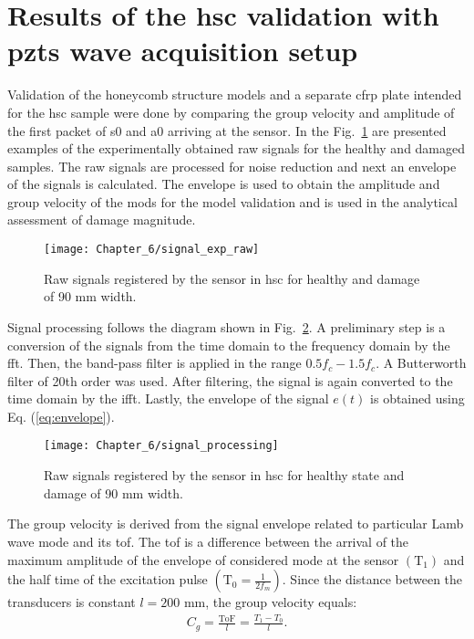 \section{Results of the \acs{hsc} validation with \acsp{pzt} wave acquisition setup}
\label{sec:resuls_pzt}
Validation of the honeycomb structure models and a separate \ac{cfrp} plate intended for the \ac{hsc} sample were done by comparing the group velocity and amplitude of the first packet of \ac{s0} and \ac{a0} arriving at the sensor.
In the Fig.~\ref{fig:signal_exp_raw} are presented examples of the experimentally obtained raw signals for the healthy and damaged samples.
The raw signals are processed for noise reduction and next an envelope of the signals is calculated.
The envelope is used to obtain the amplitude and group velocity of the mods for the model validation and is used in the analytical assessment of damage magnitude.
\begin{figure}[!htb]
	\begin{center}
		\texttt{[image: Chapter\_6/signal\_exp\_raw]}
	\end{center}
	\caption{Raw signals registered by the sensor in \acf{hsc} for healthy and damage of 90 \unit{\mm} width.}
	\label{fig:signal_exp_raw}
\end{figure}

Signal processing follows the diagram shown in Fig.~\ref{fig:signal_processing}.
A preliminary step is a conversion of the signals from the time domain to the frequency domain by the \ac{fft}.
Then, the band-pass filter is applied in the range \(0.5f_c-1.5f_c\).
A Butterworth filter of 20th order was used.
After filtering, the signal is again converted to the time domain by the \ac{ifft}.
Lastly, the envelope of the signal \(e(t)\) is obtained using Eq. (\ref{eq:envelope}).

\begin{figure}[!htb]
	\begin{center}
		\texttt{[image: Chapter\_6/signal\_processing]}
	\end{center}
	\caption{Raw signals registered by the sensor in \acf{hsc} for healthy state and damage of 90 \unit{\mm} width.}
	\label{fig:signal_processing}
\end{figure}

The group velocity is derived from the signal envelope related to particular Lamb wave mode and its \ac{tof}.
The \ac{tof} is a difference between the arrival of the maximum amplitude of the envelope of considered mode at the sensor \((\mathrm{T}_1)\) and the half time of the excitation pulse \(\left(\mathrm{T}_0=\frac{1}{2f_m}\right)\).
Since the distance between the transducers is constant \(l=200\) \unit{\mm}, the group velocity equals:
\begin{eqnarray}
	C_g = \frac{\mathrm{ToF}}{l}=\frac{T_1-T_0}{l}.
\end{eqnarray}


